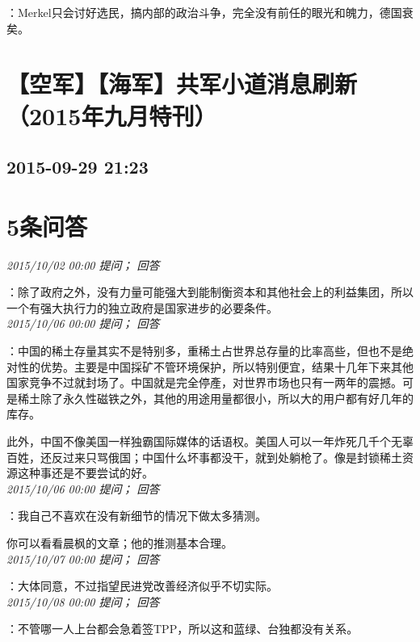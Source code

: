 \documentclass[twocolumn]{ctexart}
\begin{document}
：Merkel只会讨好选民，搞内部的政治斗争，完全没有前任的眼光和魄力，德国衰矣。\\


\section{【空军】【海军】共军小道消息刷新（2015年九月特刊）}
\subsection{2015-09-29 21:23}


\section{5条问答}

\textit{\hfill\noindent\small 2015/10/02 00:00 提问； 回答}

：除了政府之外，没有力量可能强大到能制衡资本和其他社会上的利益集团，所以一个有强大执行力的独立政府是国家进步的必要条件。\\

\textit{\hfill\noindent\small 2015/10/06 00:00 提问； 回答}

：中国的稀土存量其实不是特别多，重稀土占世界总存量的比率高些，但也不是绝对性的优势。主要是中国採矿不管环境保护，所以特别便宜，结果十几年下来其他国家竞争不过就封场了。中国就是完全停產，对世界市场也只有一两年的震撼。可是稀土除了永久性磁铁之外，其他的用途用量都很小，所以大的用户都有好几年的库存。

此外，中国不像美国一样独霸国际媒体的话语权。美国人可以一年炸死几千个无辜百姓，还反过来只骂俄国；中国什么坏事都没干，就到处躺枪了。像是封锁稀土资源这种事还是不要尝试的好。\\

\textit{\hfill\noindent\small 2015/10/06 00:00 提问； 回答}

：我自己不喜欢在没有新细节的情况下做太多猜测。

你可以看看晨枫的文章；他的推测基本合理。\\

\textit{\hfill\noindent\small 2015/10/07 00:00 提问； 回答}

：大体同意，不过指望民进党改善经济似乎不切实际。\\

\textit{\hfill\noindent\small 2015/10/08 00:00 提问； 回答}

：不管哪一人上台都会急着签TPP，所以这和蓝绿、台独都没有关系。\\
\end{document}
